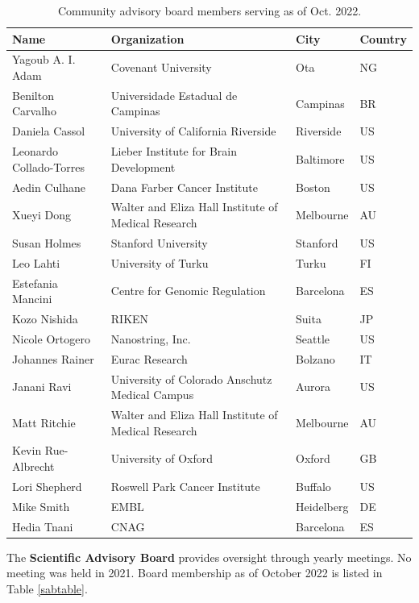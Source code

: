 \documentclass[letterpaper]{article}
\begin{document}
\begin{table}[ht]
\centering
\label{cabtable}
\caption{Community advisory board members serving as of Oct. 2022.}
\begin{tabular}{llll}
  \hline
  Name & Organization & City & Country \\ 
  \hline
 Yagoub A. I. Adam & Covenant University & Ota & NG \\ 
   Benilton Carvalho & Universidade Estadual de Campinas & Campinas & BR \\ 
   Daniela Cassol & University of California Riverside & Riverside & US \\ 
   Leonardo Collado-Torres & Lieber Institute for Brain Development & Baltimore & US \\ 
   Aedin Culhane & Dana Farber Cancer Institute & Boston & US \\ 
   Xueyi Dong & Walter and Eliza Hall Institute of Medical Research & Melbourne & AU \\ 
   Susan Holmes & Stanford University & Stanford & US \\ 
   Leo Lahti & University of Turku & Turku & FI \\ 
   Estefania Mancini & Centre for Genomic Regulation & Barcelona & ES \\ 
   Kozo Nishida & RIKEN & Suita & JP \\ 
   Nicole Ortogero & Nanostring, Inc. & Seattle & US \\ 
   Johannes Rainer & Eurac Research & Bolzano & IT \\ 
   Janani Ravi & University of Colorado Anschutz Medical Campus & Aurora & US \\ 
   Matt Ritchie & Walter and Eliza Hall Institute of Medical Research & Melbourne & AU \\ 
   Kevin Rue-Albrecht & University of Oxford & Oxford & GB \\ 
   Lori Shepherd & Roswell Park Cancer Institute & Buffalo & US \\ 
   Mike Smith & EMBL & Heidelberg & DE \\ 
   Hedia Tnani & CNAG & Barcelona & ES \\ 
   \hline
\end{tabular}
\end{table}


The \textbf{Scientific Advisory Board} provides oversight through
yearly meetings.  No meeting was held in 2021.  Board
membership as of October 2022 is listed in Table \ref{sabtable}.
\end{document}
